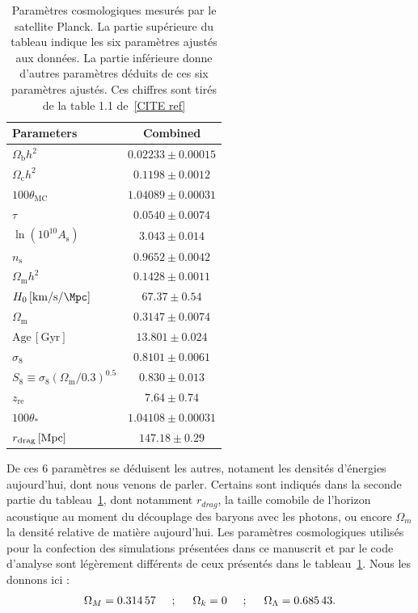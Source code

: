 \documentclass[11pt, twoside, a4paper, openright]{report}
\begin{document}
\begin{table}[h]
  \centering
  \caption{Paramètres cosmologiques mesurés par le satellite Planck. La partie supérieure du tableau indique les six paramètres ajustés aux données. La partie inférieure donne d'autres paramètres déduits de ces six paramètres ajustés. Ces chiffres sont tirés de la table 1.1 de~\ref{CITE ref}}
  \label{table:planck2018}
  \begin{tabular}{lc}
    \toprule
    Parameters & Combined \\
    \midrule
    $\Omega_{\mathrm{b}}h^2$\dotfill & $0.02233\pm0.00015$ \\
    $\Omega_{\mathrm{c}}h^2$\dotfill & $0.1198\pm0.0012$ \\
    $100\theta_{\mathrm{MC}}$\dotfill & $1.04089\pm0.00031$ \\
    $\tau$\dotfill & $0.0540\pm0.0074$ \\
    $\ln(10^{10}A_\mathrm{s})$\dotfill & $3.043\pm0.014$ \\
    $n_\mathrm{s}$\dotfill & $0.9652\pm0.0042$ \\
    \midrule
    $\Omega_{\mathrm{m}} h^2$\dotfill & $ 0.1428\pm 0.0011 $ \\
    $H_0 \,[\si{\kilo\meter\per\second\per\Mpc}]$\dotfill & $67.37\pm0.54$ \\
    $\Omega_{\mathrm{m}}$\dotfill & $0.3147\pm0.0074$ \\
    $\mathrm{Age}\, [\mathrm{Gyr}]$\dotfill  & $13.801\pm0.024$ \\
    $\sigma_8$\dotfill & $0.8101\pm0.0061$ \\
    $S_8\equiv \sigma_8 (\Omega_{\mathrm{m}}/0.3)^{0.5}$\dotfill & $0.830\pm0.013$ \\
    $z_{\mathrm{re}}$\dotfill & $7.64\pm0.74$ \\
    $100\theta_\ast$\dotfill & $1.04108\pm0.00031$ \\
    $r_{\mathrm{drag}} \,[{\rm Mpc}]$\dotfill & $147.18\pm0.29$ \\
    \bottomrule
  \end{tabular}
\end{table}

De ces 6 paramètres se déduisent les autres, notament les densités d'énergies aujourd'hui, dont nous venons de parler. Certains sont indiqués dans la seconde partie du tableau~\ref{table:planck2018},
dont notamment $r_{drag}$, la taille comobile de l'horizon acoustique au moment du découplage des baryons avec les photons,
ou encore $\Omega_m$ la densité relative de matière aujourd'hui. Les paramètres cosmologiques utilisés pour la confection des simulations présentées dans ce manuscrit et par le code d'analyse \picca{} sont légèrement différents de ceux présentés dans le tableau~\ref{table:planck2018}. Nous les donnons ici :
\begin{equation}
  \label{eq:par_cosmo}
  \Omega_M = \num{0.31457} \hspace{0.5cm} ; \hspace{0.5cm} \Omega_k = \num{0} \hspace{0.5cm} ; \hspace{0.5cm} \Omega_{\Lambda} = \num{0.68543} .
\end{equation}
\end{document}
